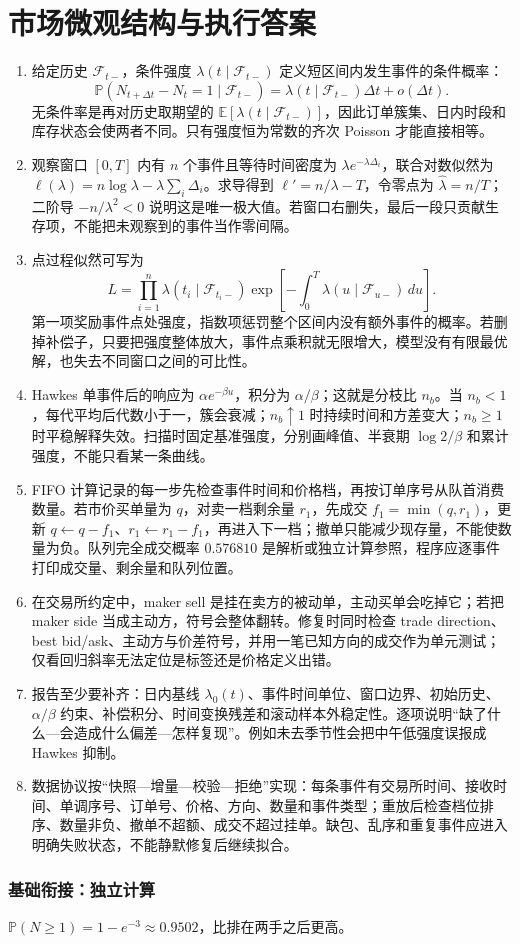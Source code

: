 \chapter{市场微观结构与执行答案}

\begin{enumerate}[leftmargin=*]
  \item 给定历史 $\mathcal F_{t-}$，条件强度 $\lambda(t\mid\mathcal F_{t-})$ 定义短区间内发生事件的条件概率：
  \[
  \mathbb P(N_{t+\Delta t}-N_t=1\mid\mathcal F_{t-})
  =\lambda(t\mid\mathcal F_{t-})\Delta t+o(\Delta t).
  \]
  无条件率是再对历史取期望的 $\mathbb E[\lambda(t\mid\mathcal F_{t-})]$，因此订单簇集、日内时段和库存状态会使两者不同。只有强度恒为常数的齐次 Poisson 才能直接相等。
  \item 观察窗口 $[0,T]$ 内有 $n$ 个事件且等待时间密度为 $\lambda e^{-\lambda\Delta_i}$，联合对数似然为 $\ell(\lambda)=n\log\lambda-\lambda\sum_i\Delta_i$。求导得到 $\ell'=n/\lambda-T$，令零点为 $\widehat\lambda=n/T$；二阶导 $-n/\lambda^2<0$ 说明这是唯一极大值。若窗口右删失，最后一段只贡献生存项，不能把未观察到的事件当作零间隔。
  \item 点过程似然可写为
  \[
  L=\prod_{i=1}^n\lambda(t_i\mid\mathcal F_{t_i-})
       \exp\left[-\int_0^T\lambda(u\mid\mathcal F_{u-})\,du\right].
  \]
  第一项奖励事件点处强度，指数项惩罚整个区间内没有额外事件的概率。若删掉补偿子，只要把强度整体放大，事件点乘积就无限增大，模型没有有限最优解，也失去不同窗口之间的可比性。
  \item Hawkes 单事件后的响应为 $\alpha e^{-\beta u}$，积分为 $\alpha/\beta$；这就是分枝比 $n_b$。当 $n_b<1$，每代平均后代数小于一，簇会衰减；$n_b\uparrow1$ 时持续时间和方差变大；$n_b\ge1$ 时平稳解释失效。扫描时固定基准强度，分别画峰值、半衰期 $\log2/\beta$ 和累计强度，不能只看某一条曲线。
  \item FIFO 计算记录的每一步先检查事件时间和价格档，再按订单序号从队首消费数量。若市价买单量为 $q$，对卖一档剩余量 $r_1$，先成交 $f_1=\min(q,r_1)$，更新 $q\leftarrow q-f_1$、$r_1\leftarrow r_1-f_1$，再进入下一档；撤单只能减少现存量，不能使数量为负。队列完全成交概率 $0.576810$ 是解析或独立计算参照，程序应逐事件打印成交量、剩余量和队列位置。
  \item 在交易所约定中，maker sell 是挂在卖方的被动单，主动买单会吃掉它；若把 maker side 当成主动方，符号会整体翻转。修复时同时检查 trade direction、best bid/ask、主动方与价差符号，并用一笔已知方向的成交作为单元测试；仅看回归斜率无法定位是标签还是价格定义出错。
  \item 报告至少要补齐：日内基线 $\lambda_0(t)$、事件时间单位、窗口边界、初始历史、$\alpha/\beta$ 约束、补偿积分、时间变换残差和滚动样本外稳定性。逐项说明“缺了什么—会造成什么偏差—怎样复现”。例如未去季节性会把中午低强度误报成 Hawkes 抑制。
  \item 数据协议按“快照—增量—校验—拒绝”实现：每条事件有交易所时间、接收时间、单调序号、订单号、价格、方向、数量和事件类型；重放后检查档位排序、数量非负、撤单不超额、成交不超过挂单。缺包、乱序和重复事件应进入明确失败状态，不能静默修复后继续拟合。
\end{enumerate}

\subsection*{基础衔接：独立计算}
$\mathbb P(N\geq1)=1-e^{-3}\approx0.9502$，比排在两手之后更高。
